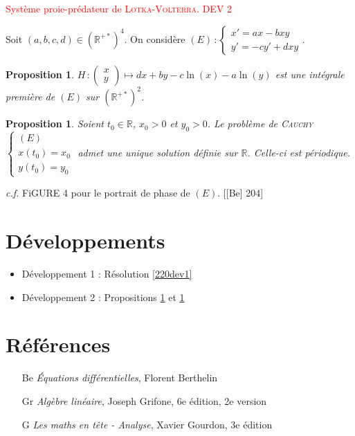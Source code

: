 \documentclass[10pt, a4paper, parskip=full, twoside, twocolumn]{report}
\newtheorem{proposition}[definition]{Proposition}
\newcommand{\IR}{\mathbb{R}}
\begin{document}
\begin{tcolorbox}[
    breakable, %
    colback=developpement, %
    colframe=gray!0!black, %
    boxrule=0pt, %
    arc=1mm, %
	boxsep=0pt,
	left=0pt, right=0pt, top=0pt, bottom=0pt
]
\textcolor{red}{Système proie-prédateur de \textsc{Lotka-Volterra}. DEV 2}

\textcolor{paragraphtext}{Soit $(a,b,c,d)\in\left(\IR^{+*}\right)^4$. On considère $(E)\,\colon\begin{cases}
	x' = ax - bxy \\ y' = -cy' + dxy
\end{cases}$.}
\begin{proposition}
	\label{220dev21}
	$H\,\colon\begin{pmatrix}
		x \\ y
	\end{pmatrix}\mapsto dx + by - c\ln(x) - a\ln(y)$ est une intégrale première de $(E)$ sur $\left(\IR^{+*}\right)^2$.
\end{proposition}
\begin{proposition}
	\label{220dev22}
	Soient $t_0\in \IR$, $x_0> 0$ et $y_0>0$. Le problème de \textsc{Cauchy} $\begin{cases}
		(E) \\ x(t_0) = x_0 \\ y(t_0) = y_0
	\end{cases}$ admet une unique solution définie sur $\IR$. Celle-ci est périodique.
\end{proposition}
\textcolor{paragraphtext}{\emph{c.f.} FiGURE 4 pour le portrait de phase de $(E)$.}
[\textnormal{[Be] 204}]
\end{tcolorbox}

\section*{Développements}
\begin{itemize}
	\item Développement 1 : Résolution \ref{220dev1}
	\item Développement 2 : Propositions \ref{220dev21} et \ref{220dev22}
\end{itemize}

\section*{Références}
\begin{itemize}
	\item[Be] \emph{Équations différentielles}, Florent Berthelin
	\item[Gr] \emph{Algèbre linéaire}, Joseph Grifone, 6e édition, 2e version
	\item[G] \emph{Les maths en tête - Analyse}, Xavier Gourdon, 3e édition 
\end{itemize}
\end{document}
